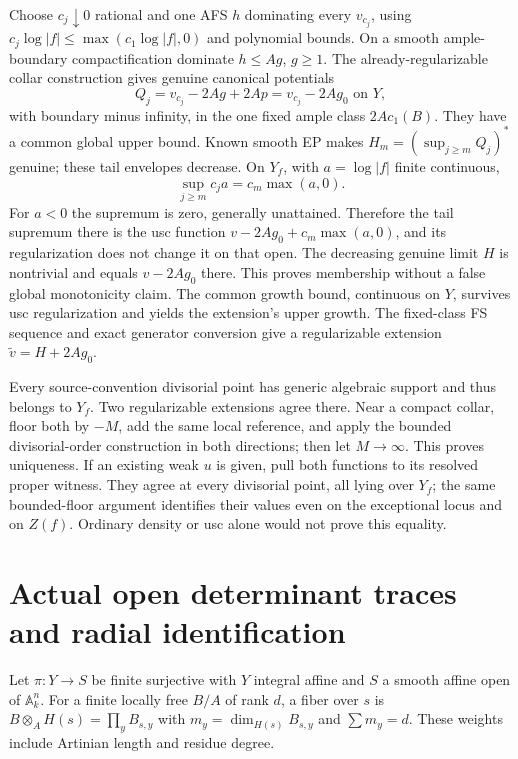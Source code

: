 \documentclass[
  10pt,
]{article}
\begin{document}
Choose \(c_j\downarrow0\) rational and one AFS \(h\) dominating every
\(v_{c_j}\), using \(c_j\log|f|\le\max(c_1\log|f|,0)\) and polynomial
bounds. On a smooth ample-boundary compactification dominate
\(h\le Ag\), \(g\ge1\). The already-regularizable collar construction
gives genuine canonical potentials
\[Q_j=v_{c_j}-2Ag+2Ap=v_{c_j}-2Ag_0\text{ on }Y,\] with boundary minus
infinity, in the one fixed ample class \(2Ac_1(B)\). They have a common
global upper bound. Known smooth EP makes \(H_m=(\sup_{j\ge m}Q_j)^*\)
genuine; these tail envelopes decrease. On \(Y_f\), with \(a=\log|f|\)
finite continuous, \[\sup_{j\ge m}c_ja=c_m\max(a,0). \tag{21}\] For
\(a<0\) the supremum is zero, generally unattained. Therefore the tail
supremum there is the usc function \(v-2Ag_0+c_m\max(a,0)\), and its
regularization does not change it on that open. The decreasing genuine
limit \(H\) is nontrivial and equals \(v-2Ag_0\) there. This proves
membership without a false global monotonicity claim. The common growth
bound, continuous on \(Y\), survives usc regularization and yields the
extension's upper growth. The fixed-class FS sequence and exact
generator conversion give a regularizable extension
\(\widetilde v=H+2Ag_0\).

Every source-convention divisorial point has generic algebraic support
and thus belongs to \(Y_f\). Two regularizable extensions agree there.
Near a compact collar, floor both by \(-M\), add the same local
reference, and apply the bounded divisorial-order construction in both
directions; then let \(M\to\infty\). This proves uniqueness. If an
existing weak \(u\) is given, pull both functions to its resolved proper
witness. They agree at every divisorial point, all lying over \(Y_f\);
the same bounded-floor argument identifies their values even on the
exceptional locus and on \(Z(f)\). Ordinary density or usc alone would
not prove this equality.

\section{Actual open determinant traces and radial
identification}\label{actual-open-determinant-traces-and-radial-identification}

Let \(\pi:Y\to S\) be finite surjective with \(Y\) integral affine and
\(S\) a smooth affine open of \(\mathbb A_k^n\). For a finite locally
free \(B/A\) of rank \(d\), a fiber over \(s\) is
\(B\otimes_AH(s)=\prod_yB_{s,y}\) with \(m_y=\dim_{H(s)}B_{s,y}\) and
\(\sum m_y=d\). These weights include Artinian length and residue
degree.
\end{document}
